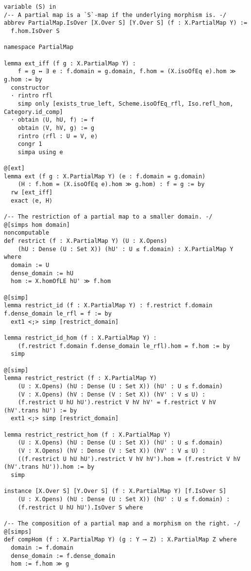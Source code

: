 \documentclass{article}
\begin{document}
\begin{lstlisting}[language=Lean, caption={RationalMap.lean}]
variable (S) in
/-- A partial map is a `S`-map if the underlying morphism is. -/
abbrev PartialMap.IsOver [X.Over S] [Y.Over S] (f : X.PartialMap Y) :=
  f.hom.IsOver S

namespace PartialMap

lemma ext_iff (f g : X.PartialMap Y) :
    f = g ↔ ∃ e : f.domain = g.domain, f.hom = (X.isoOfEq e).hom ≫ g.hom := by
  constructor
  · rintro rfl
    simp only [exists_true_left, Scheme.isoOfEq_rfl, Iso.refl_hom, Category.id_comp]
  · obtain ⟨U, hU, f⟩ := f
    obtain ⟨V, hV, g⟩ := g
    rintro ⟨rfl : U = V, e⟩
    congr 1
    simpa using e

@[ext]
lemma ext (f g : X.PartialMap Y) (e : f.domain = g.domain)
    (H : f.hom = (X.isoOfEq e).hom ≫ g.hom) : f = g := by
  rw [ext_iff]
  exact ⟨e, H⟩

/-- The restriction of a partial map to a smaller domain. -/
@[simps hom domain]
noncomputable
def restrict (f : X.PartialMap Y) (U : X.Opens)
    (hU : Dense (U : Set X)) (hU' : U ≤ f.domain) : X.PartialMap Y where
  domain := U
  dense_domain := hU
  hom := X.homOfLE hU' ≫ f.hom

@[simp]
lemma restrict_id (f : X.PartialMap Y) : f.restrict f.domain f.dense_domain le_rfl = f := by
  ext1 <;> simp [restrict_domain]

lemma restrict_id_hom (f : X.PartialMap Y) :
    (f.restrict f.domain f.dense_domain le_rfl).hom = f.hom := by
  simp

@[simp]
lemma restrict_restrict (f : X.PartialMap Y)
    (U : X.Opens) (hU : Dense (U : Set X)) (hU' : U ≤ f.domain)
    (V : X.Opens) (hV : Dense (V : Set X)) (hV' : V ≤ U) :
    (f.restrict U hU hU').restrict V hV hV' = f.restrict V hV (hV'.trans hU') := by
  ext1 <;> simp [restrict_domain]

lemma restrict_restrict_hom (f : X.PartialMap Y)
    (U : X.Opens) (hU : Dense (U : Set X)) (hU' : U ≤ f.domain)
    (V : X.Opens) (hV : Dense (V : Set X)) (hV' : V ≤ U) :
    ((f.restrict U hU hU').restrict V hV hV').hom = (f.restrict V hV (hV'.trans hU')).hom := by
  simp

instance [X.Over S] [Y.Over S] (f : X.PartialMap Y) [f.IsOver S]
    (U : X.Opens) (hU : Dense (U : Set X)) (hU' : U ≤ f.domain) :
    (f.restrict U hU hU').IsOver S where

/-- The composition of a partial map and a morphism on the right. -/
@[simps]
def compHom (f : X.PartialMap Y) (g : Y ⟶ Z) : X.PartialMap Z where
  domain := f.domain
  dense_domain := f.dense_domain
  hom := f.hom ≫ g


\end{lstlisting}
\end{document}
